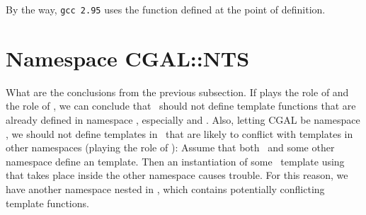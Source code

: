 By the way, \verb+gcc 2.95+ uses the function defined at the 
point of definition.

\section{Namespace CGAL::NTS}
What are the conclusions from the previous subsection. If 
plays the role of  and  the role of \cgal, we can
conclude that \cgal\ should not define template
functions that are already defined in namespace , especially
 and .
Also, letting CGAL be namespace , we should not define 
templates in \cgal\ that are likely to conflict with templates in 
other namespaces (playing the role of ): Assume that both \cgal\
and some other namespace define an  template. 
Then an instantiation of some \cgal\ template using  
that takes place inside the other namespace causes trouble. 
For this reason, we have another namespace %
nested in , which contains potentially conflicting
template functions.


